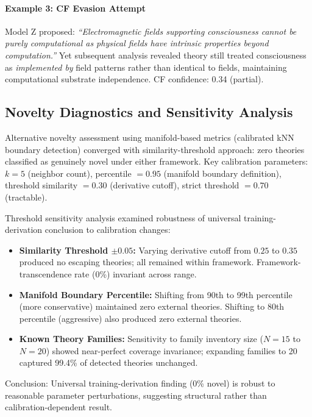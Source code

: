 \paragraph{Example 3: CF Evasion Attempt} Model Z proposed: \textit{``Electromagnetic fields supporting consciousness cannot be purely computational as physical fields have intrinsic properties beyond computation.''} Yet subsequent analysis revealed theory still treated consciousness as \emph{implemented by} field patterns rather than identical to fields, maintaining computational substrate independence. CF confidence: 0.34 (partial).

\subsection{Novelty Diagnostics and Sensitivity Analysis}
\label{sec:t3_novelty_sensitivity}

Alternative novelty assessment using manifold-based metrics (calibrated kNN boundary detection) converged with similarity-threshold approach: zero theories classified as genuinely novel under either framework. Key calibration parameters: $k=5$ (neighbor count), percentile $= 0.95$ (manifold boundary definition), threshold similarity $= 0.30$ (derivative cutoff), strict threshold $= 0.70$ (tractable).

Threshold sensitivity analysis examined robustness of universal training-derivation conclusion to calibration changes:

\begin{itemize}
  \item \textbf{Similarity Threshold $\pm 0.05$:} Varying derivative cutoff from $0.25$ to $0.35$ produced no escaping theories; all remained within framework. Framework-transcendence rate (0\%) invariant across range.
  \item \textbf{Manifold Boundary Percentile:} Shifting from 90th to 99th percentile (more conservative) maintained zero external theories. Shifting to 80th percentile (aggressive) also produced zero external theories.
  \item \textbf{Known Theory Families:} Sensitivity to family inventory size ($N=15$ to $N=20$) showed near-perfect coverage invariance; expanding families to 20 captured 99.4\% of detected theories unchanged.
\end{itemize}

Conclusion: Universal training-derivation finding (0\% novel) is robust to reasonable parameter perturbations, suggesting structural rather than calibration-dependent result.

